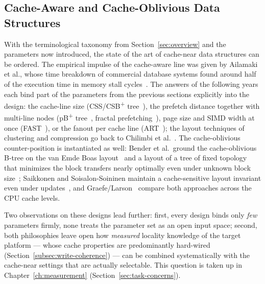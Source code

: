 \begin{nurkurz}
\subsection{Cache-Aware and Cache-Oblivious Data Structures}\label{subsec:cc-structures}
With the terminological taxonomy from Section~\ref{sec:overview} and the parameters now introduced, the state
of the art of cache-near data structures can be ordered. The empirical impulse of the cache-aware line was
given by Ailamaki et al., whose time breakdown of commercial database systems found around half of the
execution time in memory stall cycles~\cite{ailamaki1999dbms}. The answers of the following years each bind
part of the parameters from the previous sections explicitly into the design: the cache-line size
(CSS/CSB\textsuperscript{+} tree~\cite{rao1999css,rao2000csb}), the prefetch distance together with multi-line
nodes (pB\textsuperscript{+} tree~\cite{chen2001prefetch}, fractal prefetching~\cite{chen2002fractal}), page
size and SIMD width at once (FAST~\cite{kim2010fast}), or the fanout per cache line (ART~\cite{leis2013art});
the layout techniques of clustering and compression go back to Chilimbi et al.~\cite{chilimbi1999layout}. The
cache-oblivious counter-position is instantiated as well: Bender et al.\ ground the cache-oblivious B-tree on
the van Emde Boas layout~\cite{bender2005coboblivious} and a layout of a tree of fixed topology that minimizes
the block transfers nearly optimally even under unknown block
size~\cite{bender2002treelayout,bender2000cobtree}; Saikkonen and Soisalon-Soininen maintain a
cache-sensitive layout invariant even under updates~\cite{saikkonen2008multilevel,saikkonen2016layout}, and
Graefe/Larson~\cite{graefe2001btree} compare both approaches across the CPU cache levels.

Two observations on these designs lead further: first, every design binds only \emph{few} parameters firmly,
none treats the parameter set as an open input space; second, both philosophies leave open how
\emph{measured} locality knowledge of the target platform --- whose cache properties are predominantly
hard-wired (Section~\ref{subsec:write-coherence}) --- can be combined systematically with the cache-near
settings that are actually selectable. This question is taken up in Chapter~\ref{ch:measurement}
(Section~\ref{sec:task-concerns}).
\end{nurkurz}

